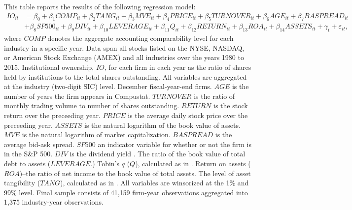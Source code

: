 \begin{tablenotes}
\tiny
\item This table reports the results of the following regression model:
\begin{equation*}
\begin{aligned}
IO_{it} &= \beta_{0} + \beta_{1}COMP_{it} + \beta_{2}TANG_{it} + \beta_{3}MVE_{it} + \beta_{4}PRICE_{it} + \beta_{5}TURNOVER_{it} + \beta_{6}AGE_{it} + \beta_{7}BASPREAD_{it} \\
&+ \beta_{8}SP500_{it} + \beta_{9}DIV_{it} + \beta_{10}LEVERAGE_{it} + \beta_{11}Q_{it} + \beta_{12}RETURN_{it} + \beta_{13}ROA_{it} + \beta_{14}ASSETS_{it} + \gamma_{t} + \varepsilon_{it},
\end{aligned}
\end{equation*}
where $COMP$ denotes the aggregate accounting comparability level for each industry in a specific year. Data span all stocks listed on the NYSE, NASDAQ, or American Stock Exchange (AMEX) and all industries over the years 1980 to 2015. Institutional ownership, $IO$, for each firm in each year as the ratio of shares held by institutions to the total shares outstanding. All variables are aggregated at the industry (two-digit SIC) level. December fiscal-year-end firms. $AGE$ is the number of years the firm appears in Compustat.
$TURNOVER$ is the ratio of monthly trading volume to number of shares outstanding.
$RETURN$ is the stock return over the preceeding year.
$PRICE$ is the average daily stock price over the preceeding year.
$ASSETS$ is the natural logarithm of the book value of assets.
$MVE$ is the natural logarithm of market capitalization.
$BASPREAD$ is the average bid-ask spread.
$SP500$ an indicator variable for whether or not the firm is in the S\&P 500.
$DIV$ is the dividend yield .
The ratio of the book value of total debt to assets ($LEVERAGE$.)
Tobin's $q$ ($Q$), calculated as in \cite{chungpruitt1994}.
Return on assets  ($ROA$)--the ratio of net income to the book value of total assets.
The level of asset tangibility ($TANG$), calculated as in \cite{almeidacampello2007}. All variables are winsorized at the 1\% and 99\% level. Final sample consists of 41,159 firm-year observations aggregated into 1,375 industry-year observations.
\end{tablenotes}
